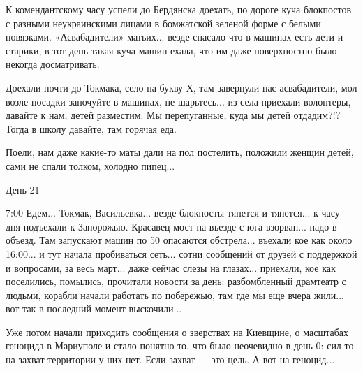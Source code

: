 К комендантскому часу успели до Бердянска доехать, по дороге куча блокпостов с
разными неукраинскими лицами в бомжатской зеленой форме с белыми повязками.
«Асвабадители» матьих... везде спасало что в машинах есть дети и старики, в тот
день такая куча машин ехала, что им даже поверхностно было некогда
досматривать.

Доехали почти до Токмака, село на букву Х, там завернули нас асвабадители, мол
возле посадки заночуйте в машинах, не шарьтесь... из села приехали волонтеры,
давайте к нам, детей разместим. Мы перепуганные, куда мы детей отдадим?!? Тогда
в школу давайте, там горячая еда.

Поели, нам даже какие-то маты дали на пол постелить, положили женщин детей,
сами не спали толком, холодно пипец...

День 21

7:00 Едем... Токмак, Васильевка... везде блокпосты тянется и тянется... к часу дня
подъехали к Запорожью. Красавец мост на въезде с юга взорван... надо в объезд.
Там запускают машин по 50 опасаются обстрела... въехали кое как около 16:00... и
тут начала пробиваться сеть... сотни сообщений от друзей с поддержкой и
вопросами, за весь март... даже сейчас слезы на глазах... приехали, кое как
поселились, помылись, прочитали новости за день: разбомбленный драмтеатр с
людьми, корабли начали работать по побережью, там где мы еще вчера жили... вот
так в последний момент выскочили...

Уже потом начали приходить сообщения о зверствах на Киевщине, о масштабах
геноцида в Мариуполе и стало понятно то, что было неочевидно в день 0: сил то
на захват территории у них нет. Если захват — это цель. А вот на геноцид...

